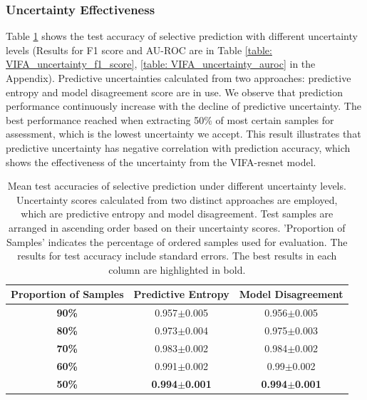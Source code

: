 \documentclass[10pt]{article} %
\begin{document}
\subsubsection{Uncertainty Effectiveness}

Table \ref{table: VIFA_uncertainty_acc} shows the test accuracy of selective prediction with different uncertainty levels (Results for F1 score and AU-ROC are in Table \ref{table: VIFA_uncertainty_f1_score}, \ref{table: VIFA_uncertainty_auroc} in the Appendix). Predictive uncertainties calculated from two approaches: predictive entropy and model disagreement score are in use. We observe that prediction performance continuously increase with the decline of predictive uncertainty. The best performance reached when extracting 50\% of most certain samples for assessment, which is the lowest uncertainty we accept.
This result illustrates that predictive uncertainty has negative correlation with prediction accuracy, which shows the effectiveness of the uncertainty from the VIFA-resnet model. 

\begin{table}[!htp]
\caption{Mean test accuracies of selective prediction under different uncertainty levels. Uncertainty scores calculated from two distinct approaches are employed, which are predictive entropy and model disagreement. Test samples are arranged in ascending order based on their uncertainty scores. 'Proportion of Samples' indicates the percentage of ordered samples used for evaluation. The results for test accuracy include standard errors. The best results in each column are highlighted in bold.}
\label{table: VIFA_uncertainty_acc}
\begin{center}
\begin{tabular}{c|c|c}
\textbf{Proportion of Samples} & \textbf{Predictive Entropy} & \textbf{Model Disagreement} \\ \hline
\textbf{90\%}                               & 0.957$\pm$0.005                 & 0.956$\pm$0.005                 \\
\textbf{80\%}                               & 0.973$\pm$0.004                 & 0.975$\pm$0.003                 \\
\textbf{70\%}                               & 0.983$\pm$0.002                 & 0.984$\pm$0.002                 \\
\textbf{60\%}                               & 0.991$\pm$0.002                 & 0.99$\pm$0.002                  \\
\textbf{50\%}                               & \textbf{0.994$\pm$0.001}                 & \textbf{0.994$\pm$0.001}        
\end{tabular}
\end{center}
\end{table}
\end{document}
